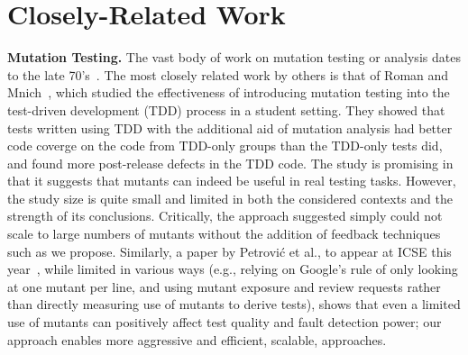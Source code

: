 \section{Closely-Related Work}

\noindent\textbf{Mutation Testing.}
%
The vast body of work on mutation testing or analysis dates
to the late 70's~\cite{demillo1978hints,budd1980theoretical}.  
The most closely related work by others is that of Roman and
Mnich~\cite{tddmut}, which studied the effectiveness of introducing
mutation testing into the test-driven development (TDD) process in a
student setting.  They showed that tests written using TDD with the
additional aid of mutation analysis had better code coverge on the
code from TDD-only groups than the TDD-only tests did, and found more
post-release defects in the TDD code.  
The study is promising in that it suggests that mutants can indeed be
useful in real testing tasks.  However, the study size is quite small and
limited in both the considered contexts and the strength of its
conclusions.  Critically, the approach suggested simply could not scale to large
numbers of mutants without the addition of feedback techniques such
as we propose.   Similarly, a paper by Petrovi\'c et al., to appear at ICSE this
year~\cite{MutImpTest}, while limited in various ways (e.g., relying on Google's rule of only looking at one
mutant per line, and using mutant exposure and review requests rather than
directly measuring use of mutants to derive tests), 
shows that even a limited use of mutants can positively affect test
quality and fault detection power; our approach enables more
aggressive and efficient, scalable, approaches.


